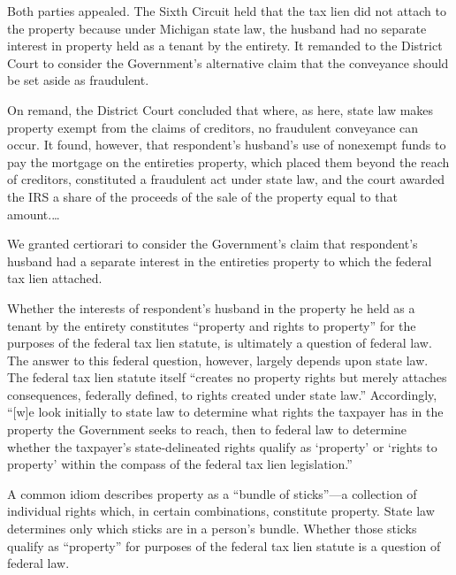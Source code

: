 Both parties appealed. The Sixth Circuit held that the tax lien did not attach
to the property because under Michigan state law, the husband had no separate
interest in property held as a tenant by the entirety. It remanded to the
District Court to consider the Government's alternative claim that the
conveyance should be set aside as fraudulent.

On remand, the District Court concluded that where, as here, state law makes
property exempt from the claims of creditors, no fraudulent conveyance can
occur. It found, however, that respondent's husband's use of nonexempt funds to
pay the mortgage on the entireties property, which placed them beyond the reach
of creditors, constituted a fraudulent act under state law, and the court
awarded the IRS a share of the proceeds of the sale of the property equal to
that amount.\dots

We granted certiorari to consider the Government's claim that respondent's
husband had a separate interest in the entireties property to which the federal
tax lien attached.


Whether the interests of respondent's husband in the property he held as a
tenant by the entirety constitutes ``property and rights to property'' for the
purposes of the federal tax lien statute, is ultimately a question of federal
law. The answer to this federal question, however, largely depends upon state
law. The federal tax lien statute itself ``creates no property rights but
merely attaches consequences, federally defined, to rights created under state
law.'' Accordingly, ``[w]e look initially to state law to determine what rights
the taxpayer has in the property the Government seeks to reach, then to federal
law to determine whether the taxpayer's state-delineated rights qualify as
`property' or `rights to property' within the compass of the federal tax lien
legislation.''

A common idiom describes property as a ``bundle of sticks''---a collection of
individual rights which, in certain combinations, constitute property. State
law determines only which sticks are in a person's bundle. Whether those sticks
qualify as ``property'' for purposes of the federal tax lien statute is a
question of federal law.

